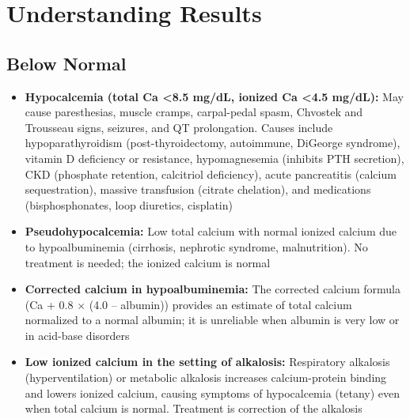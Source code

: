 \section*{Understanding Results}

\subsection*{Below Normal}
\begin{itemize}
  \item \textbf{Hypocalcemia (total Ca <8.5 mg/dL, ionized Ca <4.5 mg/dL):} May cause paresthesias, muscle cramps, carpal-pedal spasm, Chvostek and Trousseau signs, seizures, and QT prolongation. Causes include hypoparathyroidism (post-thyroidectomy, autoimmune, DiGeorge syndrome), vitamin D deficiency or resistance, hypomagnesemia (inhibits PTH secretion), CKD (phosphate retention, calcitriol deficiency), acute pancreatitis (calcium sequestration), massive transfusion (citrate chelation), and medications (bisphosphonates, loop diuretics, cisplatin)
  \item \textbf{Pseudohypocalcemia:} Low total calcium with normal ionized calcium due to hypoalbuminemia (cirrhosis, nephrotic syndrome, malnutrition). No treatment is needed; the ionized calcium is normal
  \item \textbf{Corrected calcium in hypoalbuminemia:} The corrected calcium formula (Ca + 0.8 $\times$ (4.0 -- albumin)) provides an estimate of total calcium normalized to a normal albumin; it is unreliable when albumin is very low or in acid-base disorders
  \item \textbf{Low ionized calcium in the setting of alkalosis:} Respiratory alkalosis (hyperventilation) or metabolic alkalosis increases calcium-protein binding and lowers ionized calcium, causing symptoms of hypocalcemia (tetany) even when total calcium is normal. Treatment is correction of the alkalosis
\end{itemize}

